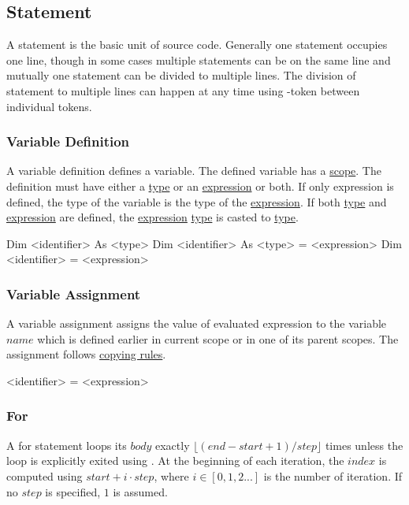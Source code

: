 \subsection{Statement}
\label{statement}
A statement is the basic unit of source code.
Generally one statement occupies one line,
though in some cases multiple statements can be on the same line
and mutually one statement can be divided to multiple lines.
The division of statement to multiple lines can happen
at any time using \token{\string_}-token between individual tokens.

\subsubsection{Variable Definition}
\label{stat:vardes}
A variable definition defines a variable.
The defined variable has a \hyperref[scope]{scope}.
The definition must have either a \hyperref[type]{type} or an \hyperref[expr]{expression} or both.
If only expression is defined, the type of the variable is the type of the \hyperref[expr]{expression}.
If both \hyperref[type]{type} and \hyperref[expr]{expression} are defined, the \hyperref[expr]{expression} \hyperref[type]{type} is casted to \hyperref[type]{type}.

\begin{grammar}%
Dim <identifier> As <type>
Dim <identifier> As <type> = <expression>
Dim <identifier> = <expression>
\end{grammar}

\subsubsection{Variable Assignment}
\label{stat:varass}
A variable assignment assigns the value of evaluated expression to the variable $name$
which is defined earlier in current scope or in one of its parent scopes.
The assignment follows \hyperref[copying]{copying rules}.

\begin{grammar}%
<identifier> = <expression>
\end{grammar}

\subsubsection{For}
\label{stat:for}
A for statement loops its $body$ exactly $\lfloor(end - start + 1) / step\rfloor$ times
unless the loop is explicitly exited using .
At the beginning of each iteration,
the $index$ is computed using $start + i \cdot step$,
where $i \in [0, 1, 2 ...]$ is the number of iteration.
If no $step$ is specified, $1$ is assumed.


